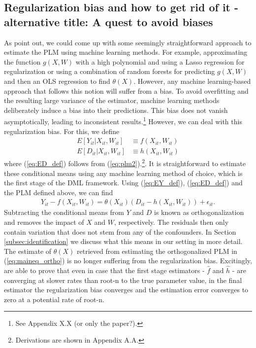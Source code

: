 \subsection{Regularization bias and how to get rid of it - alternative title: A quest to avoid biases}
As \cite{DML2017} point out, we could come up with some seemingly straightforward approach to estimate the PLM using machine learning methods. For example, approximating the function $g(X, W)$ with a high polynomial and using a Lasso regression for regularization or using a combination of random forests for predicting $g(X, W)$ and then an OLS regression to find $\theta(X)$. However, any machine learning-based approach that follows this notion will suffer from a bias. To avoid overfitting and the resulting large variance of the estimator, machine learning methods deliberately induce a bias into their predictions. This bias does not vanish asymptotically, leading to inconsistent results.\footnote{See Appendix X.X (or only the paper?).} However, we can deal with this regularization bias. For this, we define 
\begin{align}
    E[Y_{it}|X_{it}, W_{it}] &\equiv f(X_{it}, W_{it}) \label{eq:EY_def}\\ 
    E[D_{it}|X_{it}, W_{it}] &\equiv h(X_{it}, W_{it}) \label{eq:ED_def}
\end{align}
where (\ref{eq:ED_def}) follows from (\ref{eq:plm2}).\footnote{Derivations are shown in Appendix A.A.}. It is straightforward to estimate these conditional means using any machine learning method of choice, which is the first stage of the DML framework. Using (\ref{eq:EY_def}), (\ref{eq:ED_def}) and the PLM defined above, we can find 
\begin{align}
    Y_{it}-f(X_{it}, W_{it})=\theta(X_{it})(D_{it}-h(X_{it}, W_{it})) + \epsilon_{it}. \label{eq:maineq_ortho}
\end{align}
Subtracting the conditional means from $Y$ and $D$ is known as orthogonalization and removes the impact of $X$ and $W$, respectively. The residuals then only contain variation that does not stem from any of the confounders. In Section \ref{subsec:identification} we discuss what this means in our setting in more detail. The estimate of $\theta(X)$ retrieved from  estimating the orthogonalized PLM in (\ref{eq:maineq_ortho}) is no longer suffering from the regularization bias. Excitingly, \cite{DML2017} are able to prove that even in case that the first stage estimators - $\hat{f}$ and $\hat{h}$ - are converging at slower rates than root-n to the true parameter value, in the final estimator the regularization bias converges and the estimation error converges to zero at a potential rate of root-n. \\
